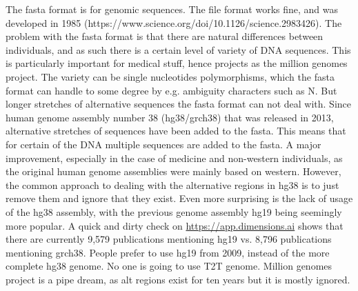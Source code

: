 The fasta format is for genomic sequences. The file format works fine, and was developed in 1985 (https://www.science.org/doi/10.1126/science.2983426). The problem with the fasta format is that there are natural differences between individuals, and as such there is a certain level of variety of DNA sequences. This is particularly important for medical stuff, hence projects as the million genomes project. The variety can be single nucleotides polymorphisms, which the fasta format can handle to some degree by e.g. ambiguity characters such as N. But longer stretches of alternative sequences the fasta format can not deal with. Since human genome assembly number 38 (hg38/grch38) that was released in 2013, alternative stretches of sequences have been added to the fasta. This means that for certain of the DNA multiple sequences are added to the fasta. A major improvement, especially in the case of medicine and non-western individuals, as the original human genome assemblies were mainly based on western. However, the common approach to dealing with the alternative regions in hg38 is to just remove them and ignore that they exist. Even more surprising is the lack of usage of the hg38 assembly, with the previous genome assembly hg19 being seemingly more popular. A quick and dirty check on \url{https://app.dimensions.ai} shows that there are currently 9,579 publications mentioning hg19 vs. 8,796 publications mentioning grch38. People prefer to use hg19 from 2009, instead of the more complete hg38 genome. No one is going to use T2T genome. Million genomes project is a pipe dream, as alt regions exist for ten years but it is mostly ignored.


